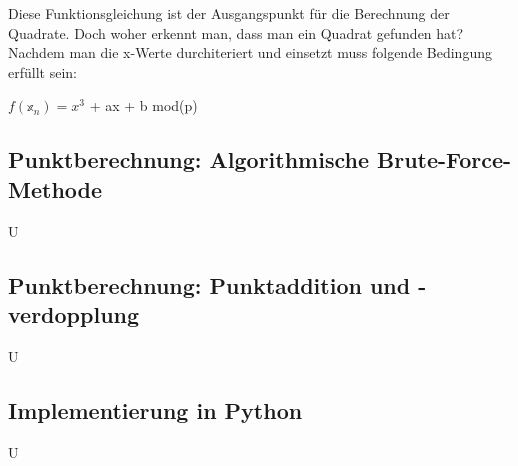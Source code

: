Diese Funktionsgleichung ist der Ausgangspunkt für die Berechnung der Quadrate. Doch woher erkennt man, dass man ein Quadrat gefunden hat?Nachdem man die x-Werte durchiteriert und einsetzt muss folgende Bedingung erfüllt sein:
\begin{center}
$f(\mathbb{x}_n) =  x^{3}$ + ax + b  mod(p)
\end{center}

\subsection{Punktberechnung: Algorithmische Brute-Force-Methode}
U

\subsection{Punktberechnung: Punktaddition und -verdopplung}
U

\subsection{Implementierung in Python}
U




































